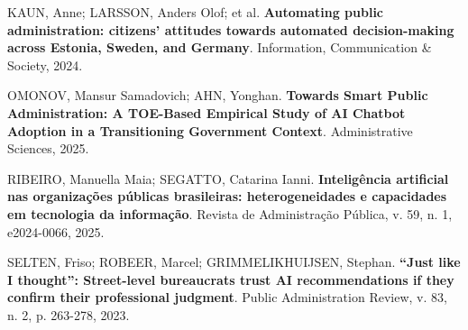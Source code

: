 \documentclass[12pt]{article}
\begin{document}
KAUN, Anne; LARSSON, Anders Olof; et al. \textbf{Automating public administration: citizens' attitudes towards automated decision-making across Estonia, Sweden, and Germany}. Information, Communication \& Society, 2024.

OMONOV, Mansur Samadovich; AHN, Yonghan. \textbf{Towards Smart Public Administration: A TOE-Based Empirical Study of AI Chatbot Adoption in a Transitioning Government Context}. Administrative Sciences, 2025.

RIBEIRO, Manuella Maia; SEGATTO, Catarina Ianni. \textbf{Inteligência artificial nas organizações públicas brasileiras: heterogeneidades e capacidades em tecnologia da informação}. Revista de Administração Pública, v. 59, n. 1, e2024-0066, 2025.

SELTEN, Friso; ROBEER, Marcel; GRIMMELIKHUIJSEN, Stephan. \textbf{“Just like I thought”: Street-level bureaucrats trust AI recommendations if they confirm their professional judgment}. Public Administration Review, v. 83, n. 2, p. 263-278, 2023.
\end{document}
